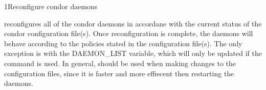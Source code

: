 \begin{ManPage}{}{1}{Reconfigure condor daemons}
\label{man-condor-reconfig}
\Synopsis {}

\Description 

 reconfigures all of the condor daemons in accordane with 
the current
status of the condor configuration file(s).  Once reconfiguration is complete,
the daemons will behave according to the policies stated in the configuration
file(s).  The only exception is with the DAEMON\_LIST variable, which will only be
updated if the  command is used.  In general,
 should be used when making changes to the configuration
files, since it is faster and more effiecent then restarting the daemons.


\begin{Options}
\end{Options}

\end{ManPage}
